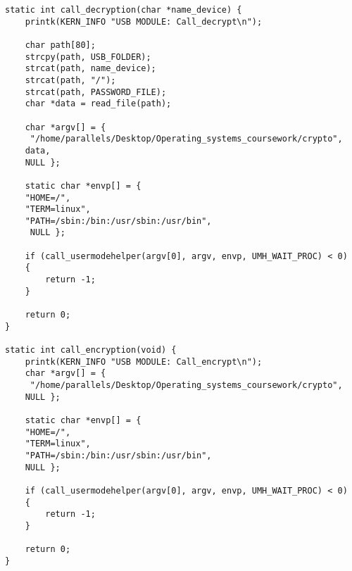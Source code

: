  \begin{lstlisting}[caption = Функции вызывающие исполняемый файл пользовательского пространства, label =  lst:user_call]
 static int call_decryption(char *name_device) {
	printk(KERN_INFO "USB MODULE: Call_decrypt\n");
    
    char path[80];
    strcpy(path, USB_FOLDER);
    strcat(path, name_device);
    strcat(path, "/");
    strcat(path, PASSWORD_FILE);
    char *data = read_file(path);
	
    char *argv[] = {
     "/home/parallels/Desktop/Operating_systems_coursework/crypto",
    data,
    NULL };

    static char *envp[] = {
    "HOME=/",
    "TERM=linux",
    "PATH=/sbin:/bin:/usr/sbin:/usr/bin", 
     NULL };

    if (call_usermodehelper(argv[0], argv, envp, UMH_WAIT_PROC) < 0) 
    {
        return -1;
    }

    return 0;
}

static int call_encryption(void) {
    printk(KERN_INFO "USB MODULE: Call_encrypt\n");
    char *argv[] = {
     "/home/parallels/Desktop/Operating_systems_coursework/crypto",
    NULL };

    static char *envp[] = {
    "HOME=/",
    "TERM=linux",
    "PATH=/sbin:/bin:/usr/sbin:/usr/bin", 
    NULL };

    if (call_usermodehelper(argv[0], argv, envp, UMH_WAIT_PROC) < 0) 
    {
        return -1;
    }

    return 0;
}
  \end{lstlisting}
